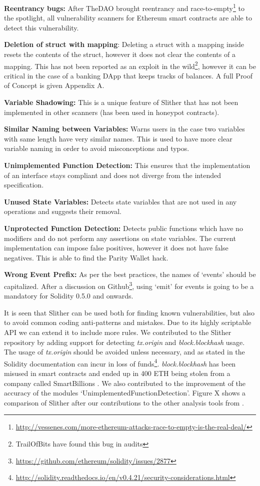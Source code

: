 \textbf{Reentrancy bugs:} After TheDAO brought reentrancy and race-to-empty\footnote{\url{http://vessenes.com/more-ethereum-attacks-race-to-empty-is-the-real-deal/}} to the spotlight, all vulnerability scanners for Ethereum smart contracts are able to detect this vulnerability.

\textbf{Deletion of struct with mapping}: Deleting a struct with a mapping inside resets the contents of the struct, however it does not clear the contents of a mapping. This has not been reported as an exploit in the wild\footnote{TrailOfBits have found this bug in audits}, however it can be critical in the case of a banking DApp that keeps tracks of balances. A full Proof of Concept is given Appendix A. %

\textbf{Variable Shadowing:} This is a unique feature of Slither that has not been implemented in other scanners (has been used in honeypot contracts).

\textbf{Similar Naming between Variables:} Warns users in the case two variables with same length have very similar names. This is used to have more clear variable naming in order to avoid misconceptions and typos.

\textbf{Unimplemented Function Detection:} This ensures that the implementation of an interface stays compliant and does not diverge from the intended specification.

\textbf{Unused State Variables:} Detects state variables that are not used in any operations and suggests their removal.

\textbf{Unprotected Function Detection:} Detects public functions which have no modifiers and do not perform any assertions on state variables. The current implementation can impose false positives, however it does not have false negatives. This is able to find the Parity Wallet hack.

\textbf{Wrong Event Prefix:} As per the best practices, the names of `events' should be capitalized. After a discussion on Github\footnote{\url{https://github.com/ethereum/solidity/issues/2877}}, using `emit' for events is going to be a mandatory for Solidity 0.5.0 and onwards.

It is seen that Slither can be used both for finding known vulnerabilities, but also to avoid common coding anti-patterns and mistakes. Due to its highly scriptable API we can extend it to include more rules. We contributed to the Slither repository by adding support for detecting \textit{tx.origin} and \textit{block.blockhash} usage. The usage of \textit{tx.origin} should be avoided unless necessary, and as stated in the Solidity documentation can incur in loss of funds\footnote{\url{http://solidity.readthedocs.io/en/v0.4.21/security-considerations.html}}. \textit{block.blockhash} has been misused in smart contracts and ended up in 400 ETH being stolen from a company called SmartBillions \cite{smartbillions}. We also contributed to the improvement of the accuracy of the modules `UnimplementedFunctionDetection'. Figure X shows a comparison of Slither after our contributions to the other analysis tools from \cite{tools}. 

